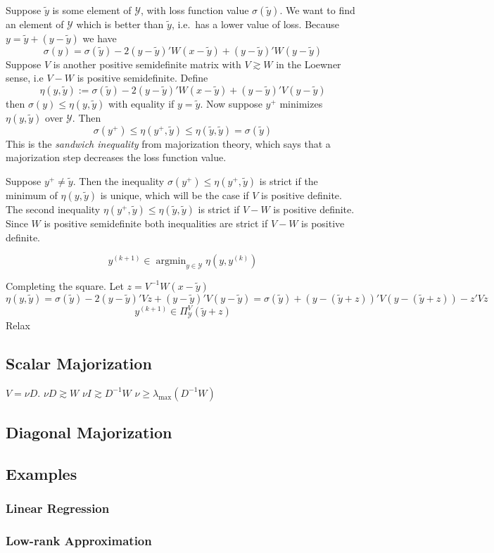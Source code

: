 \documentclass[
  12pt,
  letterpaper,
  DIV=11,
  numbers=noendperiod]{scrartcl}
\begin{document}
Suppose \(\tilde y\) is some element of \(\mathcal{Y}\), with loss
function value \(\sigma(\tilde y)\). We want to find an element of
\(\mathcal{Y}\) which is better than \(\tilde y\), i.e.~has a lower
value of loss. Because \(y=\tilde y+(y-\tilde y)\) we have
\begin{equation}
\sigma(y)=
\sigma(\tilde y)-2(y-\tilde y)'W(x-\tilde y)+(y-\tilde y)'W(y - \tilde y)
\end{equation} Suppose \(V\) is another positive semidefinite matrix
with \(V\gtrsim W\) in the Loewner sense, i.e \(V-W\) is positive
semidefinite. Define \begin{equation}
\eta(y,\tilde y):=
\sigma(\tilde y)-2(y-\tilde y)'W(x-\tilde y)+(y-\tilde y)'V(y - \tilde y)
\end{equation} then \(\sigma(y)\leq\eta(y,\tilde y)\) with equality if
\(y=\tilde y\). Now suppose \(y^+\) minimizes \(\eta(y,\tilde y)\) over
\(\mathcal{Y}\). Then \begin{equation}
\sigma(y^+)\leq\eta(y^+,\tilde y)\leq\eta(\tilde y,\tilde y)=\sigma(\tilde y)
\end{equation} This is the \emph{sandwich inequality} from majorization
theory, which says that a majorization step decreases the loss function
value.

Suppose \(y^+\neq\tilde y\). Then the inequality
\(\sigma(y^+)\leq\eta(y^+,\tilde y)\) is strict if the minimum of
\(\eta(y,\tilde y)\) is unique, which will be the case if \(V\) is
positive definite. The second inequality
\(\eta(y^+,\tilde y)\leq\eta(\tilde y,\tilde y)\) is strict if \(V-W\)
is positive definite. Since \(W\) is positive semidefinite both
inequalities are strict if \(V-W\) is positive definite.

\begin{equation}
y^{(k+1)}\in\mathop{\text{argmin}}_{y\in\mathcal{Y}}\eta(y,y^{(k)})
\end{equation}

Completing the square. Let \(z=V^{-1}W(x-\tilde y)\) \[
\eta(y,\tilde y)=
\sigma(\tilde y)-2(y-\tilde y)'Vz+(y-\tilde y)'V(y - \tilde y)=
\sigma(\tilde y)+(y-(\tilde y+z))'V(y-(\tilde y+z))-z'Vz
\] \[
y^{(k+1)}\in\Pi_\mathcal{Y}^V(\tilde y+z)
\] Relax

\subsection{Scalar Majorization}\label{scalar-majorization}

\(V=\nu D\). \(\nu D\gtrsim W\) \(\nu I\gtrsim D^{-1}W\)
\(\nu\geq\lambda_{\text{max}}(D^{-1}W)\)

\subsection{Diagonal Majorization}\label{diagonal-majorization}

\subsection{Examples}\label{examples}

\subsubsection{Linear Regression}\label{linear-regression}

\subsubsection{Low-rank Approximation}\label{low-rank-approximation}
\end{document}
